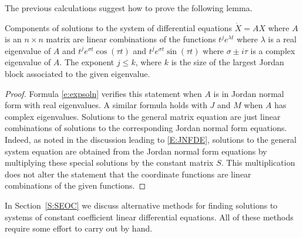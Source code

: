 \documentclass{ximera}
\begin{document}
The previous calculations suggest how to prove the following lemma.

\begin{lemma}  \label{R:pdeg}
Components of solutions to the system of differential equations $\dot{X}=AX$ 
where $A$ is an $n\times n$ matrix are linear combinations of the functions 
$t^je^{\lambda t}$ where $\lambda$ is a real eigenvalue of $A$ and 
$t^je^{\sigma t}\cos(\tau t)$ and $t^je^{\sigma t}\sin(\tau t)$ where
$\sigma\pm i\tau$ is a complex eigenvalue of $A$.   The exponent $j\leq k$, 
where $k$ is the size of the largest Jordan block associated to the given
eigenvalue. 
\end{lemma}

\begin{proof}  Formula \eqref{e:expsoln} verifies this statement when $A$ is in Jordan 
normal form with real eigenvalues.  A similar formula holds with $J$ and $M$ 
when $A$ has complex eigenvalues.  Solutions to the general matrix equation 
are just linear combinations of solutions to the corresponding Jordan normal 
form equations.  Indeed, as noted in the discussion leading to \eqref{E:JNFDE}, 
solutions to the general system equation are obtained from the Jordan normal 
form equations by multiplying these special solutions by the constant matrix
$S$.  This multiplication does not alter the statement that the coordinate
functions are linear combinations of the given functions.  \end{proof}

In Section~\ref{S:SEOC} we discuss alternative methods for finding solutions 
to systems of constant coefficient linear differential equations.  All of
these methods require some effort to carry out by hand.







 
\end{document}

